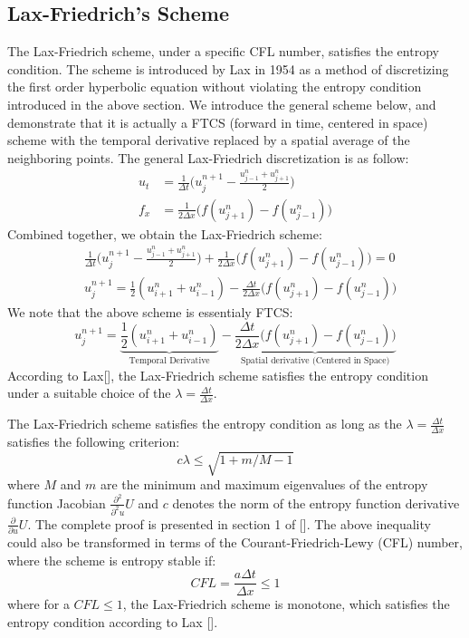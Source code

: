 \documentclass[a4paper]{article}
\numberwithin{equation}{section}
\begin{document}
\subsection{Lax-Friedrich's Scheme}
The Lax-Friedrich scheme, under a specific CFL number, satisfies the entropy condition. The scheme is introduced by Lax in 1954 as a method of discretizing the first order hyperbolic equation without violating the entropy condition introduced in the above section. We introduce the general scheme below, and demonstrate that it is actually a FTCS (forward in time, centered in space) scheme with the temporal derivative replaced by a spatial average of the neighboring points. 
The general Lax-Friedrich discretization is as follow:
\begin{equation}
    \begin{split}
        u_t &= \frac{1}{\Delta t}\big( u^{n+1}_j - \frac{u^n_{j-1} + u^n_{j+1}}{2} \big)  \\
        f_x &= \frac{1}{2\Delta x}\big(f(u^n_{j+1}) - f(u^n_{j-1})\big)
    \end{split}
\end{equation}
Combined together, we obtain the Lax-Friedrich scheme:
\begin{equation}
    \begin{split}
        &\frac{1}{\Delta t}\big( u^{n+1}_j - \frac{u^n_{j-1} + u^n_{j+1}}{2} \big) + \frac{1}{2\Delta x}\big(f(u^n_{j+1}) - f(u^n_{j-1})\big) = 0 \\
        &u_j^{n+1} = \frac{1}{2}(u_{i+1}^n + u_{i-1}^n) - \frac{\Delta t}{2\Delta x}\big(f(u^n_{j+1}) - f(u^n_{j-1})\big)
    \end{split}
\end{equation}
We note that the above scheme is essentialy FTCS:
\begin{equation}
    u_j^{n+1} = \underbrace{\frac{1}{2}(u_{i+1}^n + u_{i-1}^n)}_{\text{Temporal Derivative}} - \underbrace{\frac{\Delta t}{2\Delta x}\big(f(u^n_{j+1}) - f(u^n_{j-1})\big)}_{\text{Spatial derivative (Centered in Space)}}
\end{equation}
According to Lax[], the Lax-Friedrich scheme satisfies the entropy condition under a suitable choice of the $\lambda = \frac{\Delta t}{\Delta x}$.

The Lax-Friedrich scheme satisfies the entropy condition as long as the $\lambda = \frac{\Delta t}{\Delta x}$ satisfies the following criterion:
\begin{equation}
    c\lambda \leq \sqrt{1+m/M-1}
\end{equation}
where $M$ and $m$ are the minimum and maximum eigenvalues of the entropy function Jacobian $\frac{\partial^2}{\partial^2 u}U$ and $c$ denotes the norm of the entropy function derivative $\frac{\partial}{\partial u} U$. The complete proof is presented in section 1 of []. The above inequality could also be transformed in terms of the Courant-Friedrich-Lewy (CFL) number, where the scheme is entropy stable if:
\begin{equation}
    CFL = \frac{a \Delta t}{\Delta x} \leq 1
\end{equation}
where for a $CFL \leq 1$, the Lax-Friedrich scheme is monotone, which satisfies the entropy condition according to Lax [].
\end{document}
